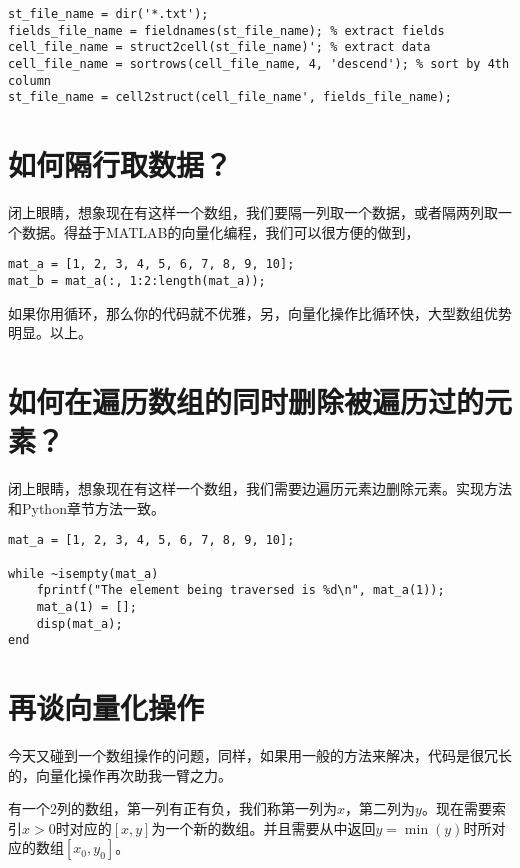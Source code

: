 \begin{verbatim}
st_file_name = dir('*.txt');
fields_file_name = fieldnames(st_file_name); % extract fields
cell_file_name = struct2cell(st_file_name)'; % extract data
cell_file_name = sortrows(cell_file_name, 4, 'descend'); % sort by 4th column
st_file_name = cell2struct(cell_file_name', fields_file_name);
\end{verbatim}

\section{如何隔行取数据？}

闭上眼睛，想象现在有这样一个数组\mcode{[1, 2, 3, 4, 5, 6, 7, 8, 9, 10]}，我们要隔一列取一个数据，或者隔两列取一个数据。得益于MATLAB的向量化编程，我们可以很方便的做到，

\begin{verbatim}
mat_a = [1, 2, 3, 4, 5, 6, 7, 8, 9, 10];
mat_b = mat_a(:, 1:2:length(mat_a));
\end{verbatim}

如果你用循环，那么你的代码就不优雅，另，向量化操作比循环快，大型数组优势明显。以上。

\section{如何在遍历数组的同时删除被遍历过的元素？}

闭上眼睛，想象现在有这样一个数组\mcode{[1, 2, 3, 4, 5, 6, 7, 8, 9, 10]}，我们需要边遍历元素边删除元素。实现方法和Python章节方法一致。

\begin{verbatim}
mat_a = [1, 2, 3, 4, 5, 6, 7, 8, 9, 10];

while ~isempty(mat_a)
    fprintf("The element being traversed is %d\n", mat_a(1));
    mat_a(1) = [];
    disp(mat_a);
end
\end{verbatim}

\section{再谈向量化操作}

今天又碰到一个数组操作的问题，同样，如果用一般的方法来解决，代码是很冗长的，向量化操作再次助我一臂之力。

有一个2列的数组，第一列有正有负，我们称第一列为$ x $，第二列为$ y $。现在需要索引$ x>0 $时对应的$ [x, y] $为一个新的数组。并且需要从中返回$ y=\min(y) $时所对应的数组$ [x_0, y_0] $。

